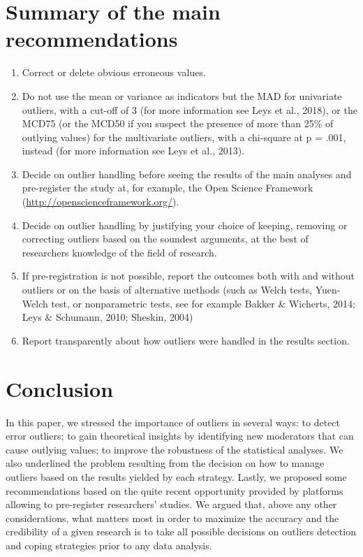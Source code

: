 \documentclass[man,floatsintext]{apa6}
\providecommand{\tightlist}{%
  \setlength{\itemsep}{0pt}\setlength{\parskip}{0pt}}
\begin{document}
\hypertarget{summary-of-the-main-recommendations}{%
\section{Summary of the main recommendations}\label{summary-of-the-main-recommendations}}

\begin{enumerate}
\def\labelenumi{\arabic{enumi})}
\tightlist
\item
  Correct or delete obvious erroneous values.
\item
  Do not use the mean or variance as indicators but the MAD for univariate outliers, with a cut-off of 3 (for more information see Leys et al., 2018), or the MCD75 (or the MCD50 if you suspect the presence of more than 25\% of outlying values) for the multivariate outliers, with a chi-square at p = .001, instead (for more information see Leys et al., 2013).
\item
  Decide on outlier handling before seeing the results of the main analyses and pre-register the study at, for example, the Open Science Framework (\url{http://openscienceframework.org/}).
\item
  Decide on outlier handling by justifying your choice of keeping, removing or correcting outliers based on the soundest arguments, at the best of researchers knowledge of the field of research.
\item
  If pre-registration is not possible, report the outcomes both with and without outliers or on the basis of alternative methods (such as Welch tests, Yuen-Welch test, or nonparametric tests, see for example Bakker \& Wicherts, 2014; Leys \& Schumann, 2010; Sheskin, 2004)
\item
  Report transparently about how outliers were handled in the results section.
\end{enumerate}

\hypertarget{conclusion}{%
\section{Conclusion}\label{conclusion}}

In this paper, we stressed the importance of outliers in several ways: to detect error outliers; to gain theoretical insights by identifying new moderators that can cause outlying values; to improve the robustness of the statistical analyses. We also underlined the problem resulting from the decision on how to manage outliers based on the results yielded by each strategy. Lastly, we proposed some recommendations based on the quite recent opportunity provided by platforms allowing to pre-register researchers' studies. We argued that, above any other considerations, what matters most in order to maximize the accuracy and the credibility of a given research is to take all possible decisions on outliers detection and coping strategies prior to any data analysis.
\end{document}

